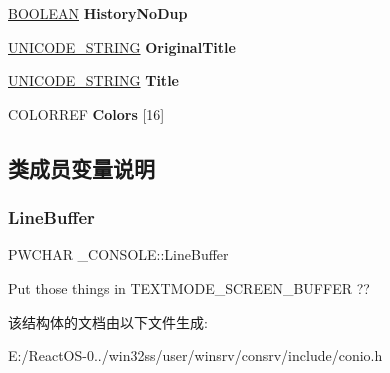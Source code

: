 \begin{DoxyCompactItemize}
\hyperlink{_processor_bind_8h_a112e3146cb38b6ee95e64d85842e380a}{B\+O\+O\+L\+E\+AN} {\bfseries History\+No\+Dup}
\item 
\mbox{\label{struct___c_o_n_s_o_l_e_af644166470bad275f25166b2a093f77d}} 
\hyperlink{struct___u_n_i_c_o_d_e___s_t_r_i_n_g}{U\+N\+I\+C\+O\+D\+E\+\_\+\+S\+T\+R\+I\+NG} {\bfseries Original\+Title}
\item 
\mbox{\label{struct___c_o_n_s_o_l_e_aac2dc54cb80d149f69b1464e7fb32cb1}} 
\hyperlink{struct___u_n_i_c_o_d_e___s_t_r_i_n_g}{U\+N\+I\+C\+O\+D\+E\+\_\+\+S\+T\+R\+I\+NG} {\bfseries Title}
\item 
\mbox{\label{struct___c_o_n_s_o_l_e_a65a1e98d20729f9f2e5e8fef1bcceff5}} 
C\+O\+L\+O\+R\+R\+EF {\bfseries Colors} \mbox{[}16\mbox{]}
\end{DoxyCompactItemize}


\subsection{类成员变量说明}
\mbox{\label{struct___c_o_n_s_o_l_e_a4ed5d4938e5f800bb407713e47e82a00}} 
\subsubsection{\texorpdfstring{Line\+Buffer}{LineBuffer}}
{\footnotesize\ttfamily P\+W\+C\+H\+AR \+\_\+\+C\+O\+N\+S\+O\+L\+E\+::\+Line\+Buffer}

Put those things in T\+E\+X\+T\+M\+O\+D\+E\+\_\+\+S\+C\+R\+E\+E\+N\+\_\+\+B\+U\+F\+F\+ER ?? 

该结构体的文档由以下文件生成\+:\begin{DoxyCompactItemize}
\item 
E\+:/\+React\+O\+S-\/0../win32ss/user/winsrv/consrv/include/conio.\+h\end{DoxyCompactItemize}
